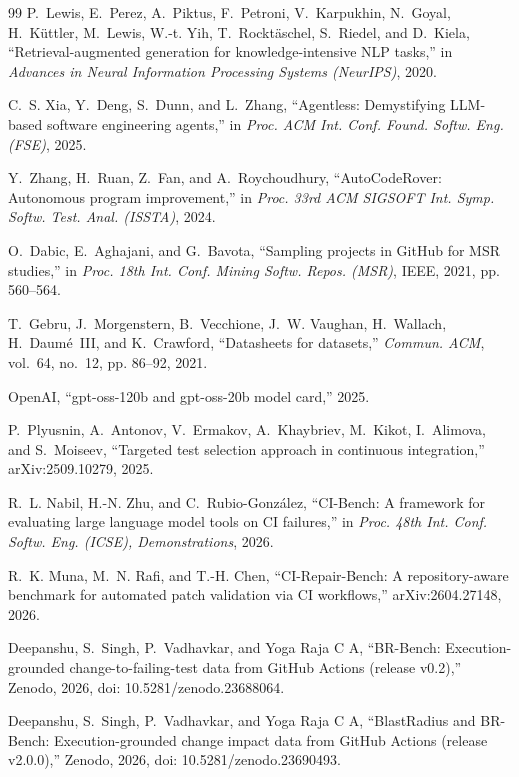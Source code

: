 \documentclass[10pt,conference]{IEEEtran}
\begin{document}
\begin{thebibliography}{99}
P.~Lewis, E.~Perez, A.~Piktus, F.~Petroni, V.~Karpukhin, N.~Goyal, H.~K{\"u}ttler, M.~Lewis, W.-t. Yih, T.~Rockt{\"a}schel, S.~Riedel, and D.~Kiela, ``Retrieval-augmented generation for knowledge-intensive {NLP} tasks,'' in \emph{Advances in Neural Information Processing Systems (NeurIPS)}, 2020.

C.~S. Xia, Y.~Deng, S.~Dunn, and L.~Zhang, ``Agentless: Demystifying {LLM}-based software engineering agents,'' in \emph{Proc. ACM Int. Conf. Found. Softw. Eng. (FSE)}, 2025.

Y.~Zhang, H.~Ruan, Z.~Fan, and A.~Roychoudhury, ``{AutoCodeRover}: Autonomous program improvement,'' in \emph{Proc. 33rd ACM SIGSOFT Int. Symp. Softw. Test. Anal. (ISSTA)}, 2024.

O.~Dabic, E.~Aghajani, and G.~Bavota, ``Sampling projects in {GitHub} for {MSR} studies,'' in \emph{Proc. 18th Int. Conf. Mining Softw. Repos. (MSR)}, IEEE, 2021, pp. 560--564.

T.~Gebru, J.~Morgenstern, B.~Vecchione, J.~W. Vaughan, H.~Wallach, H.~Daum{\'e}~III, and K.~Crawford, ``Datasheets for datasets,'' \emph{Commun. ACM}, vol.~64, no.~12, pp. 86--92, 2021.

OpenAI, ``gpt-oss-120b and gpt-oss-20b model card,'' 2025.

P.~Plyusnin, A.~Antonov, V.~Ermakov, A.~Khaybriev, M.~Kikot, I.~Alimova, and S.~Moiseev, ``Targeted test selection approach in continuous integration,'' arXiv:2509.10279, 2025.

R.~L. Nabil, H.-N. Zhu, and C.~Rubio-Gonz{\'a}lez, ``{CI-Bench}: A framework for evaluating large language model tools on {CI} failures,'' in \emph{Proc. 48th Int. Conf. Softw. Eng. (ICSE), Demonstrations}, 2026.

R.~K. Muna, M.~N. Rafi, and T.-H. Chen, ``{CI-Repair-Bench}: A repository-aware benchmark for automated patch validation via {CI} workflows,'' arXiv:2604.27148, 2026.

Deepanshu, S.~Singh, P.~Vadhavkar, and {Yoga Raja C A}, ``{BR-Bench}: Execution-grounded change-to-failing-test data from {GitHub} {Actions} (release v0.2),'' Zenodo, 2026, doi: 10.5281/zenodo.23688064.

Deepanshu, S.~Singh, P.~Vadhavkar, and {Yoga Raja C A}, ``{BlastRadius} and {BR-Bench}: Execution-grounded change impact data from {GitHub} {Actions} (release v2.0.0),'' Zenodo, 2026, doi: 10.5281/zenodo.23690493.

\end{thebibliography}
\end{document}
